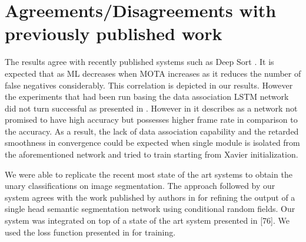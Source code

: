 \section{Agreements/Disagreements with previously published work}
The results agree with recently published systems such as Deep Sort \cite{DeepSiam:deepSort}. It is expected that as ML decreases when MOTA increases as it reduces the number of false negatives considerably. This correlation is depicted in our results.
However the experiments that had been run basing the data association LSTM network did not turn successful as presented in \cite{DeepSiam:MilanL0RS16}. However in \cite{DeepSiam:MilanL0RS16} it describes as a network not promised to have high accuracy but possesses higher frame rate in comparison to the accuracy. As a result, the lack of data association capability and the retarded smoothness in convergence could be expected when single module is isolated from the aforementioned network and tried to train starting from Xavier initialization.

We were able to replicate the recent most state of the art systems to obtain the unary classifications on image segmentation. The approach followed by our system agrees with the work published by authors in \cite{Zhen_ICCV15_CRFRNN} for refining the output of a single head semantic segmentation network using conditional random fields. Our system was integrated on top of a state of the art system presented in [76]. We used the loss function presented in \cite{Anurag17} for training.  
